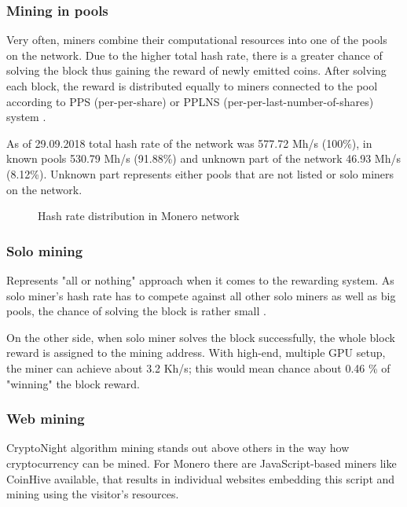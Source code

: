 \documentclass[
  printed, %
  table,   %
  nolof,     %
  nolot,     %
           oneside, color
]{fithesis3}
\begin{document}
\subsubsection{Mining in pools}
Very often, miners combine their computational resources into one of the pools on the network. Due to the higher total hash rate, there is a greater chance of solving the block thus gaining the reward of newly emitted coins. After solving each block, the reward is distributed equally to miners connected to the pool according to PPS (per-per-share) or PPLNS (per-per-last-number-of-shares) system \cite{tarasiewicz2015cryptocurrencies}.

As of 29.09.2018 total hash rate of the network was 577.72 Mh/s (100\%), in known pools 530.79 Mh/s (91.88\%) and unknown part of the network 46.93 Mh/s (8.12\%). Unknown part represents either pools that are not listed or solo miners on the network.


\begin{figure}[H]
\begin{center}
     \end{center}
      \caption{Hash rate distribution in Monero network}
      \label{chart:range}

\end{figure}
\subsubsection{Solo mining}
Represents "all or nothing" approach when it comes to the rewarding system. As solo miner's hash rate has to compete against all other solo miners as well as big pools, the chance of solving the block is rather small \cite{cong2018decentralized}.

On the other side, when solo miner solves the block successfully, the whole block reward is assigned to the mining address. With high-end, multiple GPU setup, the miner can achieve about 3.2 Kh/s; this would mean chance about 0.46 \% of "winning" the block reward. 

\subsubsection{Web mining}
CryptoNight algorithm mining stands out above others in the way how cryptocurrency can be mined. For Monero there are JavaScript-based miners like CoinHive available, that results in individual websites embedding this script and mining using the visitor's resources. 
\end{document}
